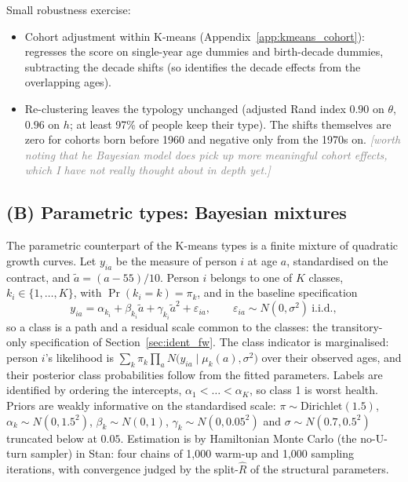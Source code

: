 \documentclass[11pt]{article}
\newcommand{\note}[1]{\textcolor{gray}{\textit{[#1]}}}
\begin{document}
Small robustness exercise:
\begin{itemize}
	\item Cohort adjustment within K-means (Appendix~\ref{app:kmeans_cohort}): regresses the score on single-year age dummies and birth-decade dummies, subtracting the decade shifts (so identifies the decade effects from the overlapping ages). 
	\item Re-clustering leaves the typology unchanged (adjusted Rand index $0.90$ on $\theta$, $0.96$ on $h$; at least 97\% of people keep their type). The shifts themselves are zero for cohorts born before 1960 and negative only from the 1970s on. \note{worth noting that he Bayesian model does pick up more meaningful cohort effects, which I have not really thought about in depth yet.}
\end{itemize}
	
	\subsection{(B) Parametric types: Bayesian mixtures} \label{subsec:parametric}
	
	The parametric counterpart of the K-means types is a finite mixture of quadratic growth curves. Let $y_{ia}$ be the measure of person $i$ at age $a$, standardised on the contract, and $\tilde a=(a-55)/10$. Person $i$ belongs to one of $K$ classes, $k_i\in\{1,\dots,K\}$, with $\Pr(k_i=k)=\pi_k$, and in the baseline specification
	\begin{equation}
		y_{ia}=\alpha_{k_i}+\beta_{k_i}\tilde a+\gamma_{k_i}\tilde a^{2}+\varepsilon_{ia},\qquad \varepsilon_{ia}\sim N(0,\sigma^{2})\ \text{i.i.d.},
		\label{eq:mixbase}
	\end{equation}
	so a class is a path and a residual scale common to the classes: the transitory-only specification of Section~\ref{sec:ident_fw}. The class indicator is marginalised: person $i$'s likelihood is $\sum_k\pi_k\prod_a N\bigl(y_{ia}\mid\mu_k(a),\sigma^2\bigr)$ over their observed ages, and their posterior class probabilities follow from the fitted parameters. Labels are identified by ordering the intercepts, $\alpha_1<\dots<\alpha_K$, so class 1 is worst health. Priors are weakly informative on the standardised scale: $\pi\sim\mathrm{Dirichlet}(1.5)$, $\alpha_k\sim N(0,1.5^2)$, $\beta_k\sim N(0,1)$, $\gamma_k\sim N(0,0.05^2)$ and $\sigma\sim N(0.7,0.5^2)$ truncated below at $0.05$. Estimation is by Hamiltonian Monte Carlo (the no-U-turn sampler) in Stan: four chains of 1,000 warm-up and 1,000 sampling iterations, with convergence judged by the split-$\hat R$ of the structural parameters.
	
\end{document}
